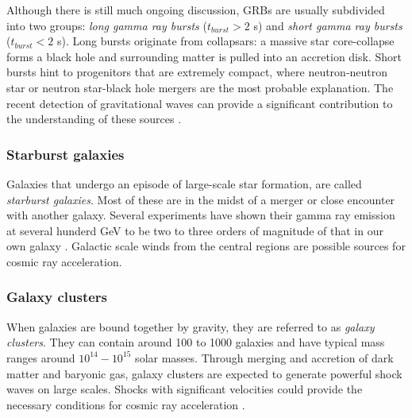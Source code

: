 \noindent Although there is still much ongoing discussion, GRBs are usually subdivided into two groups: \textit{long gamma ray bursts} ($t_{burst} > 2$ s) and \textit{short gamma ray bursts} ($t_{burst} < 2$ s). Long bursts originate from collapsars: a massive star core-collapse forms a black hole and surrounding matter is pulled into an accretion disk. Short bursts hint to progenitors that are extremely compact, where neutron-neutron star or neutron star-black hole mergers are the most probable explanation. The recent detection of gravitational waves can provide a significant contribution to the understanding of these sources \cite{TheLIGOScientific:2017qsa,Abbott:2017oio,Abbott:2017gyy,Abbott:2017vtc,Abbott:2016nmj}.


\subsubsection{Starburst galaxies}
Galaxies that undergo an episode of large-scale star formation, are called \textit{starburst galaxies}. Most of these are in the midst of a merger or close encounter with another galaxy. Several experiments have shown their gamma ray emission at several hunderd GeV to be two to three orders of magnitude of that in our own galaxy \cite{Acero:2009nb,Karlsson:2009hd}. Galactic scale winds from the central regions are possible sources for cosmic ray acceleration.

\subsubsection{Galaxy clusters}
When galaxies are bound together by gravity, they are referred to as \textit{galaxy clusters}. They can contain around 100 to 1000 galaxies and have typical mass ranges around $10^{14}-10^{15}$ solar masses. Through merging and accretion of dark matter and baryonic gas, galaxy clusters are expected to generate powerful shock waves on large scales. Shocks with significant velocities could provide the necessary conditions for cosmic ray acceleration \cite{1538-4357-689-2-L105}.


